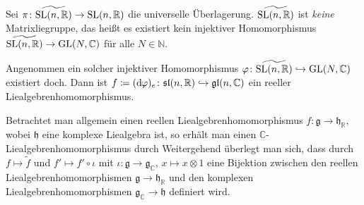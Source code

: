 Sei $\pi \colon \widetilde{\operatorname{SL}(n,\mathbb{R})} \to \operatorname{SL}(n,\mathbb{R})$ die universelle Überlagerung.
$\widetilde{\operatorname{SL}(n,\mathbb{R})}$ ist \emph{keine} Matrixliegruppe, das heißt es existiert kein injektiver Homomorphismus $\widetilde{\operatorname{SL}(n,\mathbb{R})} \to \operatorname{GL}(N,\mathbb{C})$ für alle $N \in \mathbb{N}$.
\begin{beweis}
	Angenommen ein solcher injektiver Homomorphismus $\varphi \colon \widetilde{\operatorname{SL}(n,\mathbb{R})} \hookrightarrow \operatorname{GL}(N,\mathbb{C})$ existiert doch.
	Dann ist $f \coloneqq (\mathrm{d}\mkern-1.0mu \varphi)_e \colon \mathfrak{sl}(n,\mathbb{R}) \hookrightarrow \mathfrak{gl}(n,\mathbb{C})$ ein reeller Liealgebrenhomomorphismus.
	
	Betrachtet man allgemein einen reellen Liealgebrenhomomorphismus $f \colon \mathfrak{g} \to \mathfrak{h}_{\mathbb{R}}$, wobei $\mathfrak{h}$ eine komplexe Liealgebra ist, so erhält man einen $\mathbb{C}$-Liealgebrenhomomorphismus durch
	Weitergehend überlegt man sich, dass durch $f \mapsto \tilde{f}$ und $f' \mapsto  f' \circ \iota$ mit $\iota\colon \mathfrak{g} \to \mathfrak{g}_{\mathbb{C}}$, $x \mapsto x \otimes 1$ eine Bijektion zwischen den reellen Liealgebrenhomomorphismen $\mathfrak{g} \to \mathfrak{h}_{\mathbb{R}}$ und den komplexen Liealgebrenhomomorphismen $\mathfrak{g}_{\mathbb{C}} \to \mathfrak{h}$ definiert wird.
	

\end{beweis}
